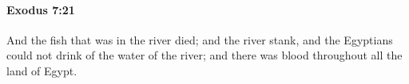 
		\paragraph{Exodus 7:21} %
			\label{EXODUS-7-21}

			And the fish that was in the river died; and the river stank, and the Egyptians could not drink of the water of the river; and there was blood throughout all the land of Egypt.


